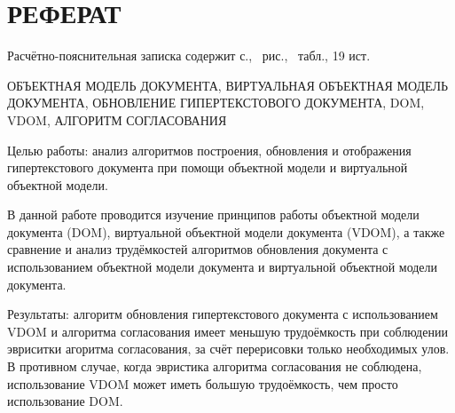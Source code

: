 \section*{РЕФЕРАТ}

Расчётно-пояснительная записка содержит \pageref{LastPage} с., \totalfigures\ рис., \totaltables\ табл., 19 ист.

ОБЪЕКТНАЯ МОДЕЛЬ ДОКУМЕНТА, ВИРТУАЛЬНАЯ ОБЪЕКТНАЯ МОДЕЛЬ ДОКУМЕНТА, ОБНОВЛЕНИЕ ГИПЕРТЕКСТОВОГО ДОКУМЕНТА, DOM, VDOM, АЛГОРИТМ СОГЛАСОВАНИЯ

Целью работы: анализ алгоритмов построения, обновления и отображения гипертекстового документа при помощи объектной модели и виртуальной объектной модели.

В данной работе проводится изучение принципов работы объектной модели документа (DOM), виртуальной объектной модели документа (VDOM), а также сравнение и анализ трудёмкостей алгоритмов обновления документа с использованием объектной модели документа и виртуальной объектной модели документа.

Результаты: алгоритм обновления гипертекстового документа с использованием VDOM и алгоритма согласования имеет меньшую трудоёмкость при соблюдении эвриситки агоритма согласования, за счёт перерисовки только необходимых улов.
В противном случае, когда эвристика алгоритма согласования не соблюдена, использование VDOM может иметь большую трудоёмкость, чем просто использование DOM.


\pagebreak
